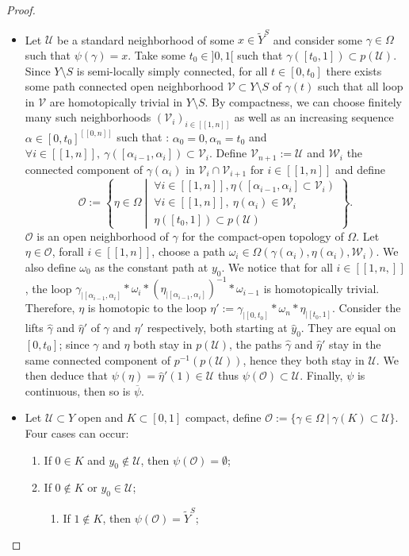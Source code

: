 \documentclass[a4paper,12pt]{article}
\def\U{\mathcal U}
\def\lsem{[\![}
\def\rsem{]\!]}
\def\V{\mathcal V}
\def\V{\mathcal V}
\def\W{\mathcal W}
\def\U{\mathcal{U}}
\begin{document}
\begin{proof}
\begin{itemize}
 \item Let $\U$ be a standard neighborhood of some $x\in \widetilde Y^S$ and consider some $\gamma\in \Omega$ such that $\psi(\gamma)=x$. Take some $t_0\in ]0,1[$ such that $\gamma([t_0,1])\subset p(\U)$.
 Since $Y\setminus S$ is semi-locally simply connected, for all $t\in [0,t_0]$ there exists some path connected open neighborhood $\V\subset Y\setminus S$ of $\gamma(t)$ such that all loop in $\V$ are homotopically trivial in $Y\setminus S$. By compactness, we can choose finitely many such neighborhoods $(\V_i)_{i\in\lsem 1,n \rsem}$ as well as an increasing sequence $\alpha\in [0,t_0]^{\lsem 0,n\rsem}$ such that :
 $\alpha_0=0, \alpha_n=t_0$ and $\forall i\in \lsem 1,n\rsem,\ \gamma([\alpha_{i-1},\alpha_i]) \subset \V_i$. 
 Define $\V_{n+1}:=\U$ and $\W_i$ the connected component of $\gamma(\alpha_i)$ in $\V_i\cap\V_{i+1}$ for $i\in \lsem 1,n\rsem$ and define 
 $$\mathcal O := \left\{\eta\in \Omega ~\left|~\begin{array}{l}
                                                     \forall i\in \lsem 1,n\rsem, \eta([\alpha_{i-1},\alpha_i]\subset \V_i)  \\ \forall i\in \lsem 1,n\rsem,\ \eta(\alpha_i)\in\W_i \\ 
                                                     \eta([t_0,1])\subset p(\U)
                                                      \end{array} \right.\right\}.$$
$\mathcal O$ is an open neighborhood of $\gamma$ for the compact-open topology of $\Omega$. Let $\eta\in \mathcal O$, forall $i\in \lsem 1,n\rsem $, choose a path  $\omega_i \in 
\Omega(\gamma(\alpha_i),\eta(\alpha_i),\W_i)$. We also define $\omega_0$ as the 
constant path at $y_0$. We notice that for all $i\in \lsem 1,n,\rsem$, the loop $
\gamma_{|[\alpha_{i-1},\alpha_i]}*\omega_i*(\eta_{|[\alpha_{i-1},\alpha_i]})^{-1}*\omega_{i-1} $ is homotopically trivial. Therefore, $\eta$ is homotopic to the loop 
$\eta':=\gamma_{|[0,t_0]}*\omega_n*\eta_{|[t_0,1]}$. Consider the lifts $\hat\gamma$
and $\hat\eta'$ of $\gamma$ and $\eta'$ respectively, both starting at $\hat y_0$. They are equal on $[0,t_0]$; since $\gamma$ and $\eta$ both stay in $p(\U)$, the paths $\hat\gamma$ and $\hat\eta'$ stay in the same connected component of $p^{-1}(p(\U))$, hence they both stay in $\U$. We then deduce that $\psi(\eta)=\hat\eta'(1)\in \U$ thus $\psi(\mathcal O)\subset \U$.
Finally, $\psi$ is continuous, then so is $\overline \psi$.

\item Let $\U\subset Y$ open and $K\subset [0,1]$ compact, define 
$\mathcal O := \{ \gamma\in \Omega~|~ \gamma(K)\subset \U \}$. Four cases can occur:
\begin{enumerate}
 \item If $0\in K$ and $y_0 \notin \U $, then $\psi(\mathcal O)= \emptyset$;
 \item If $0\notin K$ or $y_0 \in \U$;
    \begin{enumerate}
     \item If $1 \notin K$, then $\psi(\mathcal O)=\widetilde Y^S$;
     

\end{enumerate}
\end{enumerate}
\end{itemize}
\end{proof}
\end{document}
